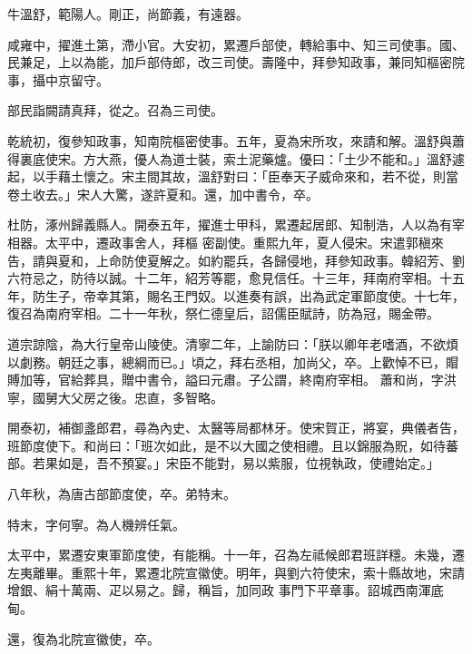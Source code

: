 \begin{pinyinscope}
 牛溫舒，範陽人。剛正，尚節義，有遠器。



 咸雍中，擢進土第，滯小官。大安初，累遷戶部使，轉給事中、知三司使事。國、
 民兼足，上以為能，加戶部侍郎，改三司使。壽隆中，拜參知政事，兼同知樞密院事，攝中京留守。



 部民詣闕請真拜，從之。召為三司使。



 乾統初，復參知政事，知南院樞密使事。五年，夏為宋所攻，來請和解。溫舒與蕭得裏底使宋。方大燕，優人為道士裝，索土泥藥爐。優曰：「土少不能和。」溫舒遽起，以手藉土懷之。宋主間其故，溫舒對曰：「臣奉天子威命來和，若不從，則當卷土收去。」宋人大驚，遂許夏和。還，加中書令，卒。



 杜防，涿州歸義縣人。開泰五年，擢進士甲科，累遷起居郎、知制浩，人以為有宰相器。太平中，遷政事舍人，拜樞
 密副使。重熙九年，夏人侵宋。宋遣郭稹來告，請與夏和，上命防使夏解之。如約罷兵，各歸侵地，拜參知政事。韓紹芳、劉六符忌之，防待以誠。十二年，紹芳等罷，愈見信任。十三年，拜南府宰相。十五年，防生子，帝幸其第，賜名王門奴。以進奏有誤，出為武定軍節度使。十七年，復召為南府宰相。二十一年秋，祭仁德皇后，詔儒臣賦詩，防為冠，賜金帶。



 道宗諒陰，為大行皇帝山陵使。清寧二年，上諭防曰：「朕以卿年老嗜酒，不欲煩以劇務。朝廷之事，總綱而已。」頃之，拜右丞相，加尚父，卒。上歡悼不已，賵賻加等，官給葬具，贈中書令，謚曰元肅。子公謂，終南府宰相。
 蕭和尚，字洪寧，國舅大父房之後。忠直，多智略。



 開泰初，補御盞郎君，尋為內史、太醫等局都林牙。使宋賀正，將宴，典儀者告，班節度使下。和尚曰：「班次如此，是不以大國之使相禮。且以錦服為貺，如待蕃部。若果如是，吾不預宴。」宋臣不能對，易以紫服，位視執政，使禮始定。」



 八年秋，為唐古部節度使，卒。弟特末。



 特末，字何寧。為人機辨任氣。



 太平中，累遷安東軍節度使，有能稱。十一年，召為左祗候郎君班詳穩。未幾，遷左夷離畢。重熙十年，累遷北院宣徽使。明年，與劉六符使宋，索十縣故地，宋請增銀、絹十萬兩、疋以易之。歸，稱旨，加同政
 事門下平章事。詔城西南渾底甸。



 還，復為北院宣徽使，卒。




\end{pinyinscope}
